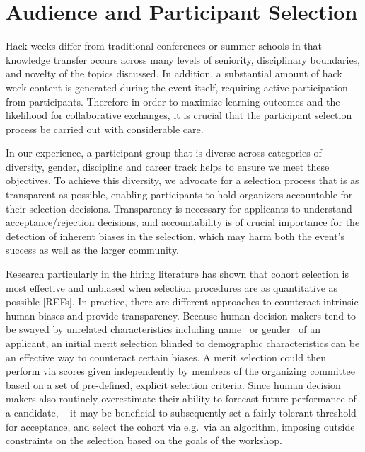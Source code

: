 \section*{Audience and Participant Selection}

Hack weeks differ from traditional conferences or summer schools in that knowledge transfer occurs across many levels of seniority, disciplinary boundaries, and novelty of the topics discussed.
In addition, a substantial amount of hack week content is generated during the event itself, requiring active participation from participants.
Therefore in order to maximize learning outcomes and the likelihood for collaborative exchanges, it is crucial that the participant selection process be carried out with considerable care.

In our experience, a participant group that is diverse across categories of diversity, gender, discipline and career track helps to ensure we meet these objectives.
To achieve this diversity, we advocate for a selection process that is as transparent as possible, enabling participants to hold organizers accountable for their selection decisions.
Transparency is necessary for applicants to understand acceptance/rejection decisions, and accountability is of crucial importance for the detection of inherent biases in the selection, which may harm both the event's success as well as the larger community.

Research particularly in the hiring literature has shown that cohort selection is most effective and unbiased when selection procedures are as quantitative as possible [REFs]. 
In practice, there are different approaches to counteract intrinsic human biases and provide transparency. 
Because human decision makers tend to be swayed by unrelated characteristics including name~\cite{bertrand2004} or gender~\cite{mossracusin2012} of an applicant, an initial merit selection blinded to demographic characteristics can be an effective way to counteract certain biases. A merit selection could then perform via scores given independently by members of the organizing committee based on a set of pre-defined, explicit selection criteria. 
Since human decision makers also routinely overestimate their ability to forecast future performance of a candidate, ~\cite{highhouse2008} it may be beneficial to subsequently set a fairly tolerant threshold for acceptance, and select the cohort via e.g.\ via an algorithm, imposing outside constraints on the selection based on the goals of the workshop. 

